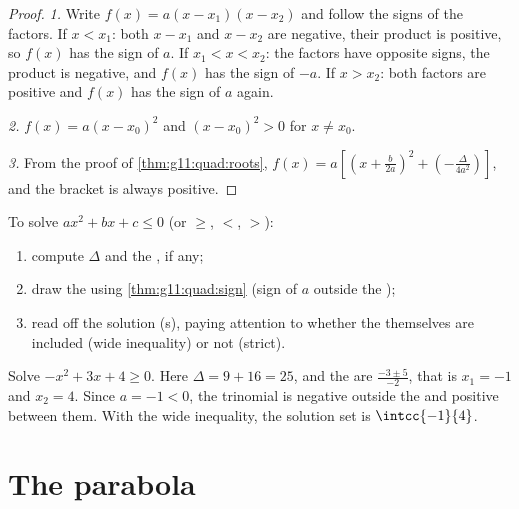 \begin{proof}
\emph{1.} Write $f(x) = a(x-x_1)(x-x_2)$ and follow the signs of the
factors. If $x < x_1$: both $x - x_1$ and $x - x_2$ are negative, their
product is positive, so $f(x)$ has the sign of $a$. If $x_1 < x < x_2$: the
factors have opposite signs, the product is negative, and $f(x)$ has the
sign of $-a$. If $x > x_2$: both factors are positive and $f(x)$ has the
sign of $a$ again.

\emph{2.} $f(x) = a(x - x_0)^2$ and $(x-x_0)^2 > 0$ for $x \neq x_0$.

\emph{3.} From the proof of \cref{thm:g11:quad:roots},
$f(x) = a\left[\left(x + \frac{b}{2a}\right)^2 +
\left(-\frac{\Delta}{4a^2}\right)\right]$, and the bracket is always
positive.
\end{proof}

\begin{method}\label{met:g11:quad:inequalities}
To solve $ax^2 + bx + c \leq 0$ (or $\geq$, $<$, $>$):
\begin{enumerate}
  \item compute $\Delta$ and the , if any;
  \item draw the  using \cref{thm:g11:quad:sign} (sign of $a$
        outside the );
  \item read off the solution (s), paying attention to whether the
         themselves are included (wide inequality) or not (strict).
\end{enumerate}
\end{method}

\begin{example}\label{ex:g11:quad:inequality}
Solve $-x^2 + 3x + 4 \geq 0$. Here $\Delta = 9 + 16 = 25$, and the 
are $\frac{-3 \pm 5}{-2}$, that is $x_1 = -1$ and $x_2 = 4$. Since
$a = -1 < 0$, the trinomial is negative outside the  and positive
between them. With the wide inequality, the solution set is
$\intcc{-1}{4}$.
\end{example}

\section{The parabola}

